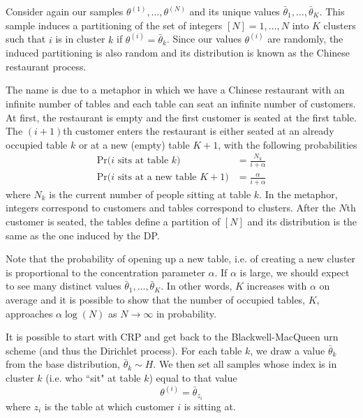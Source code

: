\documentclass[final,3p,times,twocolumn]{elsarticle}
\begin{document}
Consider again our samples $\theta^{(1)},\dots,\theta^{(N)}$ and its unique values $\bar \theta_1,\dots,\bar \theta_K$.
This sample induces a partitioning of the set of integers $[N] = {1,\dots,N}$ into $K$ clusters such that $i$ is in cluster $k$ if $\theta^{(i)} = \bar \theta_k$.
Since our values $\theta^{(i)}$ are randomly, the induced partitioning is also random and its distribution is known as the Chinese restaurant process.

The name is due to a metaphor in which we have a Chinese restaurant with an infinite number of tables and each table can seat an infinite number of customers.
At first, the restaurant is empty and the first customer is seated at the first table. 
The $(i+1)$th customer enters the restaurant is either seated at an already occupied table $k$ or at a new (empty) table $K+1$, with the following probabilities
\begin{equation}
\label{eqn:crp}
\begin{split}
\mbox{Pr($i$ sits at table $k$)} &= \frac{N_k}{i+\alpha}\\
\mbox{Pr($i$ sits at a new table $K+1$)} &= \frac{\alpha}{i+\alpha}
\end{split}
\end{equation}
where $N_k$ is the current number of people sitting at table $k$.
In the metaphor, integers correspond to customers and tables correspond to clusters. 
After the $N$th customer is seated, the tables define a partition of $[N]$ and its distribution is the same as the one induced by the DP.

Note that the probability of opening up a new table, i.e. of creating a new cluster is proportional to the concentration parameter $\alpha$.
If $\alpha$ is large, we should expect to see many distinct values $\bar \theta_1,\dots,\bar \theta_K$.
In other words, $K$ increases with $\alpha$ on average and it is possible to show that the number of occupied tables, $K$, approaches $\alpha \log(N)$ as $N \rightarrow \infty$ in probability.

It is possible to start with CRP and get back to the Blackwell-MacQueen urn scheme (and thus the Dirichlet process). 
For each table $k$, we draw a value $\bar \theta_k$ from the base distribution, $\bar \theta_k \sim H$.
We then set all samples whose index is in cluster $k$ (i.e. who ``sit" at table $k$) equal to that value
\begin{equation}
\theta^{(i)} = \bar \theta_{z_i}
\end{equation}
where $z_i$ is the table at which customer $i$ is sitting at.
\end{document}
